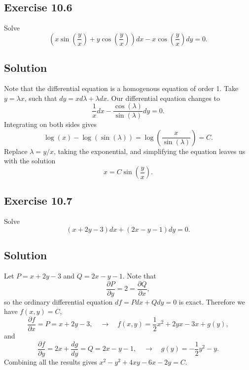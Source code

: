 \subsection*{Exercise 10.6}

Solve
\begin{equation*}
    \left(x \sin\left(\frac{y}{x}\right) + y \cos\left(\frac{y}{x}\right)\right)dx - x \cos\left(\frac{y}{x}\right) dy = 0.
\end{equation*}

\subsection*{Solution}

Note that the differential equation is a homogenous equation of order 1.
Take $y = \lambda x$, such that $dy = xd\lambda + \lambda dx$.
Our differential equation changes to
\begin{equation*}
    \frac{1}{x} dx - \frac{\cos(\lambda)}{\sin(\lambda)} dy = 0.
\end{equation*}
Integrating on both sides gives
\begin{equation*}
    \log(x) - \log(\sin(\lambda)) = \log\left(\frac{x}{\sin(\lambda)}\right) = C.
\end{equation*}
Replace $\lambda = y/x$, taking the exponential, and simplifying the equation leaves us with the solution
\begin{equation*}
    x = C \sin\left(\frac{y}{x}\right).
\end{equation*}


\subsection*{Exercise 10.7}

Solve
\begin{equation*}
    (x + 2y - 3) dx + (2x - y - 1) dy = 0.
\end{equation*}

\subsection*{Solution}

Let $P = x + 2y - 3$ and $Q = 2x - y - 1$.
Note that
\begin{equation*}
    \frac{\partial P}{\partial y} = 2 = \frac{\partial Q}{\partial x},
\end{equation*}
so the ordinary differential equation $df = P dx + Q dy = 0$ is exact.
Therefore we have $f(x, y) = C$,
\begin{equation*}
    \frac{\partial f}{\partial x} = P = x + 2y - 3, \quad \rightarrow \quad f(x, y) = \frac{1}{2}x^2 + 2yx - 3x + g(y),
\end{equation*}
and
\begin{equation*}
    \frac{\partial f}{\partial y} = 2x + \frac{d g}{d y} = Q = 2x - y -1, \quad \rightarrow \quad g(y) = -\frac{1}{2}y^2 - y.
\end{equation*}
Combining all the results gives $x^2 - y^2 + 4xy - 6x - 2y = C$.
